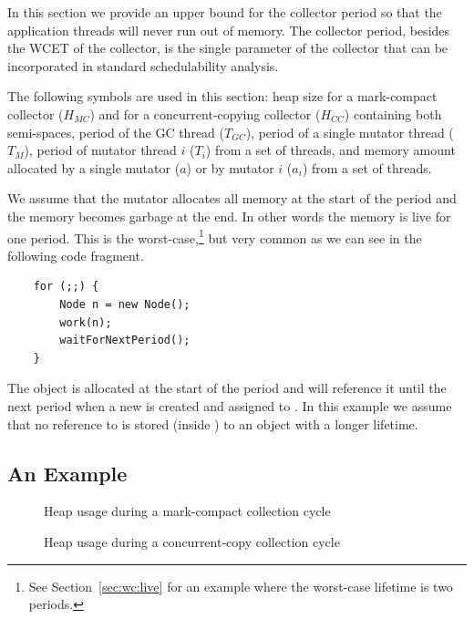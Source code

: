 In this section we provide an upper bound for the collector period
so that the application threads will never run out of memory. The
collector period, besides the WCET of the collector, is the single
parameter of the collector that can be incorporated in standard
schedulability analysis.

The following symbols are used in this section: heap size for a
mark-compact collector ($H_{MC}$) and for a concurrent-copying
collector ($H_{CC}$) containing both semi-spaces, period of the GC
thread ($T_{GC}$), period of a single mutator thread ($T_M$), period
of mutator thread $i$ ($T_i$) from a set of threads, and memory
amount allocated by a single mutator ($a$) or by mutator $i$ ($a_i$)
from a set of threads.

We assume that the mutator allocates all memory at the start of the
period and the memory becomes garbage at the end. In other words the
memory is live for one period. This is the worst-case,\footnote{See
Section~\ref{sec:wc:live} for an example where the worst-case
lifetime is two periods.} but very common as we can see in the
following code fragment.
\begin{samepage}
\begin{lstlisting}
    for (;;) {
        Node n = new Node();
        work(n);
        waitForNextPeriod();
    }
\end{lstlisting}
\end{samepage}
The object  is allocated at the start of the period and
 will reference it until the next period when a new
 is created and assigned to . In this example we
assume that no reference to  is stored (inside
) to an object with a longer lifetime.


\subsection{An Example} \label{sec:example}

\begin{figure}
\begin{center}
    
    \caption{Heap usage during a mark-compact collection cycle}
\label{fig:exmc}
\end{center}
\end{figure}

\begin{figure}
\begin{center}
    
    \caption{Heap usage during a concurrent-copy collection cycle}
\label{fig:excc}
\end{center}
\end{figure}


